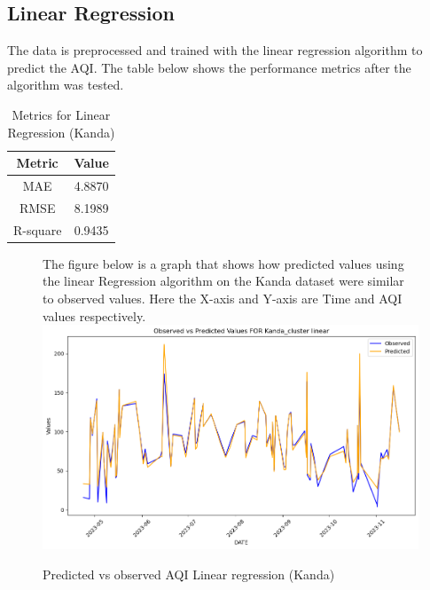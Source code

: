\documentclass{book}
\numberwithin{equation}{section}
\numberwithin{figure}{section}
\begin{document}
\subsection{Linear Regression}
The data is preprocessed and trained with the linear regression algorithm to predict the AQI. The table below shows the performance metrics after the algorithm was tested.
\begin{table}[H]
    \centering
    \begin{tabular}{|c|c|}
        \hline
        \textbf{Metric} & \textbf{Value} \\
        \hline
        MAE & 4.8870 \\
        \hline
        RMSE & 8.1989 \\
        \hline
        R-square & 0.9435 \\
        \hline
    \end{tabular}
    \caption{Metrics for Linear Regression (Kanda)}
    \label{tab: Linear metrics(Kanda)}
\end{table}
\begin{figure}[H]
 \begin{minipage}{\linewidth}
        The figure below is a graph that shows how predicted values using the linear Regression algorithm on the Kanda dataset were similar to observed values. Here the X-axis and Y-axis are Time and AQI values respectively.
        \vspace{0.5em} 
        \includegraphics[width=\linewidth]{kanda linear.png}
       
        \caption{ Predicted vs observed AQI Linear regression (Kanda)}
        \label{fig: Linear Predicted vs observed AQI(Kanda)}
    \end{minipage}
\end{figure}
\end{document}
